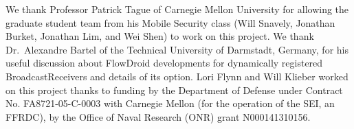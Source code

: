 \begin{acknowledgments}
We thank Professor Patrick Tague of Carnegie Mellon University for allowing the graduate student team from his Mobile Security class (Will Snavely, Jonathan Burket, Jonathan Lim, and Wei Shen) to work on this project. We thank Dr.\ Alexandre Bartel of the Technical University of Darmstadt, Germany, for his useful discussion about FlowDroid developments for dynamically registered BroadcastReceivers and details of its  option. Lori Flynn and Will Klieber worked on this project thanks to funding by the Department of Defense under Contract No. FA8721-05-C-0003 with Carnegie Mellon (for the operation of the SEI, an FFRDC), by the Office of Naval Research (ONR) grant N000141310156.
\end{acknowledgments}

